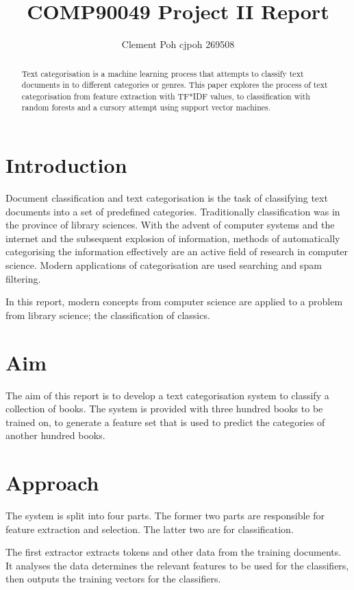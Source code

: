 \documentclass[11pt]{article}
\title{COMP90049 Project II Report}
\author{Clement Poh cjpoh 269508}
\begin{document}
\maketitle


\begin{abstract}
Text categorisation is a machine learning process that attempts to classify text
documents in to different categories or genres. This paper explores the process
of text categorisation from feature extraction with TF*IDF values, to
classification with random forests and a cursory attempt using support vector
machines.
\end{abstract}


\section{Introduction}

Document classification and text categorisation is the task of classifying text
documents into a set of predefined categories. Traditionally classification was
in the province of library sciences. With the advent of computer systems and the
internet and the subsequent explosion of information, methods of automatically
categorising the information effectively are an active field of research in
computer science. Modern applications of categorisation are used searching and
spam filtering.

In this report, modern concepts from computer science are applied to a problem
from library science; the classification of classics.

\section{Aim}

The aim of this report is to develop a text categorisation system to classify a
collection of books. The system is provided with three hundred books to be
trained on, to generate a feature set that is used to predict the categories of
another hundred books.

\section{Approach}

The system is split into four parts. The former two parts are responsible for
feature extraction and selection. The latter two are for classification.

The first extractor extracts tokens and other data from the training documents.
It analyses the data determines the relevant features to be used for the
classifiers, then outputs the training vectors for the classifiers. 
\end{document}
